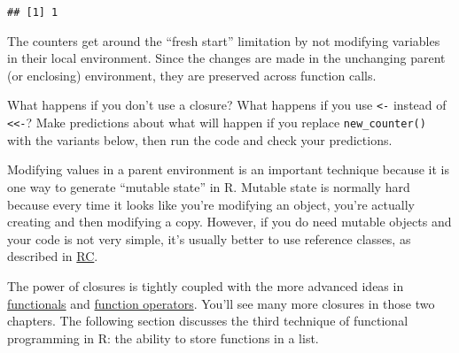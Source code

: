 \begin{Shaded}
\begin{Highlighting}[]
\NormalTok{()}
\end{Highlighting}
\end{Shaded}

\begin{verbatim}
## [1] 1
\end{verbatim}

The counters get around the ``fresh start'' limitation by not modifying
variables in their local environment. Since the changes are made in the
unchanging parent (or enclosing) environment, they are preserved across
function calls.

What happens if you don't use a closure? What happens if you use
\texttt{\textless{}-} instead of \texttt{\textless{}\textless{}-}? Make
predictions about what will happen if you replace
\texttt{new\_counter()} with the variants below, then run the code and
check your predictions.

\begin{Shaded}
\begin{Highlighting}[]
\StringTok{ }
\StringTok{ }\NormalTok{() \{}
\StringTok{ }\OperatorTok{+}\StringTok{ }
\NormalTok{\}}
\StringTok{ }\NormalTok{() \{}
\StringTok{ }
  \NormalTok{() \{}
\StringTok{ }\OperatorTok{+}\StringTok{ }
\NormalTok{  \}}
\NormalTok{\}}
\end{Highlighting}
\end{Shaded}

Modifying values in a parent environment is an important technique
because it is one way to generate ``mutable state'' in R. Mutable state
is normally hard because every time it looks like you're modifying an
object, you're actually creating and then modifying a copy. However, if
you do need mutable objects and your code is not very simple, it's
usually better to use reference classes, as described in
\protect\hyperlink{rc}{RC}.

The power of closures is tightly coupled with the more advanced ideas in
\protect\hyperlink{functionals}{functionals} and
\protect\hyperlink{function-operators}{function operators}. You'll see
many more closures in those two chapters. The following section
discusses the third technique of functional programming in R: the
ability to store functions in a list.

